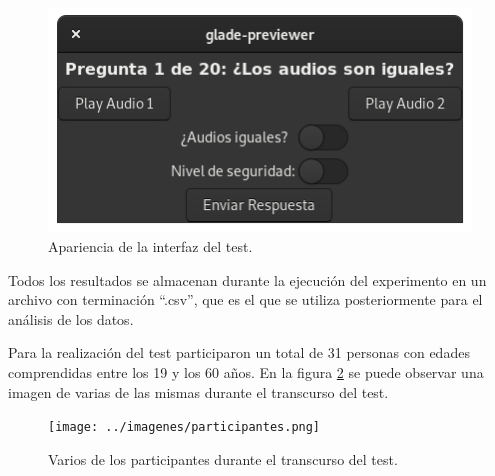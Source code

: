 \documentclass[11pt,a4paper,twoside]{book}
\begin{document}
                \begin{figure}
                    \includegraphics[scale=0.6]{../imagenes/interFin.png}
			        \centering
			        \caption{Apariencia de la interfaz del test.}
			        \label{fig:interfazTestFin}
                \end{figure}
                
                Todos los resultados se almacenan durante la ejecución del experimento en un archivo con terminación ``.csv'', que es el que se utiliza posteriormente para el análisis de los datos.
                
                Para la realización del test participaron un total de 31 personas con edades comprendidas entre los 19 y los 60 años. En la figura \ref{fig:participantes} se puede observar una imagen de varias de las mismas durante el transcurso del test.
                
                \begin{figure}
                    \texttt{[image: ../imagenes/participantes.png]}
			        \centering
			        \caption{Varios de los participantes durante el transcurso del test.}
			        \label{fig:participantes}
                \end{figure}
            
            
\end{document}

